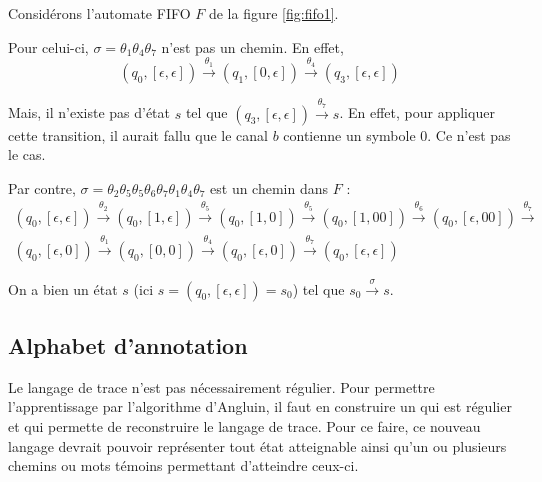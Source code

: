 \begin{example}
  Considérons l'automate FIFO $F$ de la figure \ref{fig:fifo1}.

  Pour celui-ci, $\sigma=\theta_1\theta_4\theta_7$ n'est pas un chemin. En effet,
  $$
  (q_0,[\epsilon,\epsilon])\xrightarrow{\theta_1}(q_1,[0,\epsilon])\xrightarrow{\theta_4}(q_3,[\epsilon,\epsilon])
  $$

  Mais, il n'existe pas d'état $s$ tel que $(q_3,[\epsilon,\epsilon])\xrightarrow{\theta_7}s$. En effet, pour appliquer cette transition, il aurait fallu que le canal $b$ contienne un symbole $0$. Ce n'est pas le cas.


  Par contre, $\sigma=\theta_2\theta_5\theta_5\theta_6\theta_7\theta_1\theta_4\theta_7$ est un chemin dans $F$ :
  \begin{equation*}
    \begin{gathered}
      (q_0,[\epsilon,\epsilon])\xrightarrow{\theta_2}
      (q_0,[1,\epsilon])\xrightarrow{\theta_5}
      (q_0,[1,0])\xrightarrow{\theta_5}
      (q_0,[1,00])\xrightarrow{\theta_6}
      (q_0,[\epsilon,00])\xrightarrow{\theta_7}\\
      (q_0,[\epsilon,0])\xrightarrow{\theta_1}
      (q_0,[0,0])\xrightarrow{\theta_4}
      (q_0,[\epsilon,0])\xrightarrow{\theta_7}
      (q_0,[\epsilon,\epsilon])
    \end{gathered}
  \end{equation*}

  On a bien un état $s$ (ici $s=(q_0,[\epsilon,\epsilon])=s_0$) tel que $s_0\xrightarrow{\sigma}s$.

\end{example}





\subsection{Alphabet d'annotation}

Le langage de trace n'est pas nécessairement régulier. Pour permettre l'apprentissage par l'algorithme d'Angluin, il faut en construire un qui est régulier et qui permette de reconstruire le langage de trace. Pour ce faire, ce nouveau langage devrait pouvoir représenter tout état atteignable ainsi qu'un ou plusieurs chemins ou mots témoins permettant d'atteindre ceux-ci.


